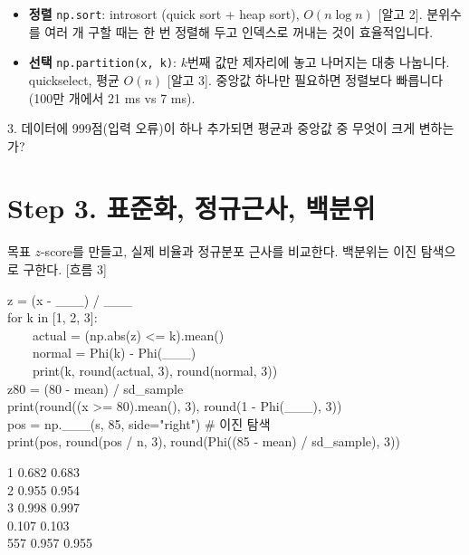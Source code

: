 \documentclass[11pt,a4paper]{article}
\newcommand{\code}[1]{\texttt{#1}}
\newcommand{\Wc}[1]{{\scriptsize\textsf{\color{blue!60!black}[흐름 #1]}}}
\newcommand{\Ac}[1]{{\scriptsize\textsf{\color{green!45!black}[알고 #1]}}}
\begin{document}
\begin{algobox}
\begin{itemize}
\item \textbf{정렬} \code{np.sort}: introsort (quick sort + heap sort), $O(n\log n)$ \Ac{2}. 분위수를 여러 개 구할 때는 한 번 정렬해 두고 인덱스로 꺼내는 것이 효율적입니다.
\item \textbf{선택} \code{np.partition(x, k)}: $k$번째 값만 제자리에 놓고 나머지는 대충 나눕니다. quickselect, 평균 $O(n)$ \Ac{3}. 중앙값 하나만 필요하면 정렬보다 빠릅니다 (100만 개에서 21 ms vs 7 ms).
\end{itemize}
\end{algobox}

\begin{qbox}
3. 데이터에 999점(입력 오류)이 하나 추가되면 평균과 중앙값 중 무엇이 크게 변하는가?
\end{qbox}

\section{Step 3. 표준화, 정규근사, 백분위}
\begin{goalbox}{목표}
$z$-score를 만들고, 실제 비율과 정규분포 근사를 비교한다. 백분위는 이진 탐색으로 구한다. \Wc{3}
\end{goalbox}

\begin{codebox}
z = (x - \_\_\_) / \_\_\_\\
for k in [1, 2, 3]:\\
\ \ \ \ actual = (np.abs(z) <= k).mean()\\
\ \ \ \ normal = Phi(k) - Phi(\_\_\_)\\
\ \ \ \ print(k, round(actual, 3), round(normal, 3))\\[3pt]
z80 = (80 - mean) / sd\_sample\\
print(round((x >= 80).mean(), 3), round(1 - Phi(\_\_\_), 3))\\[3pt]
pos = np.\_\_\_(s, 85, side="right") \hfill \# 이진 탐색\\
print(pos, round(pos / n, 3), round(Phi((85 - mean) / sd\_sample), 3))
\end{codebox}
\begin{outbox}
1 0.682 0.683\\
2 0.955 0.954\\
3 0.998 0.997\\
0.107 0.103\\
557 0.957 0.955
\end{outbox}
\end{document}
